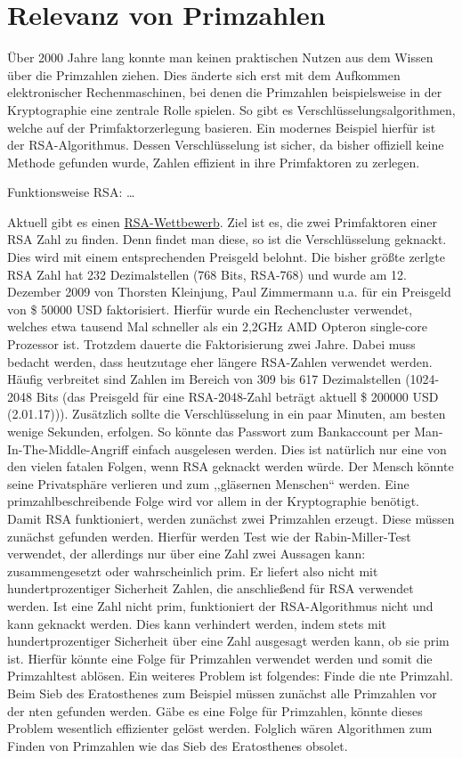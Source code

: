 \documentclass[a4paper,12pt]{article}
\begin{document}
\section{Relevanz von Primzahlen}
Über 2000 Jahre lang konnte man keinen praktischen Nutzen aus dem Wissen über die Primzahlen ziehen. Dies änderte sich erst mit dem Aufkommen elektronischer Rechenmaschinen, bei denen die Primzahlen beispielsweise in der Kryptographie eine zentrale Rolle spielen. So gibt es Verschlüsselungsalgorithmen, welche auf der Primfaktorzerlegung basieren. 
Ein modernes Beispiel hierfür ist der RSA-Algorithmus. Dessen Verschlüsselung ist sicher, da bisher offiziell keine Methode gefunden wurde, Zahlen effizient in ihre Primfaktoren zu zerlegen.

Funktionsweise RSA:
…

Aktuell gibt es einen \href{https://en.wikipedia.org/wiki/RSA_Factoring_Challenge}{RSA-Wettbewerb}. Ziel ist es, die zwei Primfaktoren einer RSA Zahl zu finden. Denn findet man diese, so ist die Verschlüsselung geknackt. Dies wird mit einem entsprechenden Preisgeld belohnt.
Die bisher größte zerlgte RSA Zahl hat 232 Dezimalstellen (768 Bits, RSA-768) und wurde am 12. Dezember 2009 von Thorsten Kleinjung, Paul Zimmermann u.a. für ein Preisgeld von \$ 50000 USD faktorisiert. Hierfür wurde ein Rechencluster verwendet, welches etwa tausend Mal schneller als ein 2,2GHz AMD Opteron single-core Prozessor ist. Trotzdem dauerte die Faktorisierung zwei Jahre. 
Dabei muss bedacht werden, dass heutzutage eher längere RSA-Zahlen verwendet werden. Häufig verbreitet sind Zahlen im Bereich von 309 bis 617 Dezimalstellen (1024-2048 Bits (das Preisgeld für eine RSA-2048-Zahl beträgt aktuell \$ 200000 USD (2.01.17))).
Zusätzlich sollte die Verschlüsselung in ein paar Minuten, am besten wenige Sekunden, erfolgen. So könnte das Passwort zum Bankaccount per Man-In-The-Middle-Angriff einfach ausgelesen werden. Dies ist natürlich nur eine von den vielen fatalen Folgen, wenn RSA geknackt werden würde. Der Mensch könnte seine Privatsphäre verlieren und zum ,,gläsernen Menschen“ werden.
Eine primzahlbeschreibende Folge wird vor allem in der Kryptographie benötigt. Damit RSA funktioniert, werden zunächst zwei Primzahlen erzeugt. Diese müssen zunächst gefunden werden. Hierfür werden Test wie der Rabin-Miller-Test verwendet, der allerdings nur über eine Zahl zwei Aussagen kann: zusammengesetzt oder wahrscheinlich prim. Er liefert also nicht mit hundertprozentiger Sicherheit Zahlen, die anschließend für RSA verwendet werden. Ist eine Zahl nicht prim, funktioniert der RSA-Algorithmus nicht und kann geknackt werden. 
Dies kann verhindert werden, indem stets mit hundertprozentiger Sicherheit über eine Zahl ausgesagt werden kann, ob sie prim ist. Hierfür könnte eine Folge für Primzahlen verwendet werden und somit die Primzahltest ablösen.
Ein weiteres Problem ist folgendes: Finde die nte Primzahl. Beim Sieb des Eratosthenes zum Beispiel müssen zunächst alle Primzahlen vor der nten gefunden werden. Gäbe es eine Folge für Primzahlen, könnte dieses Problem wesentlich effizienter gelöst werden. Folglich wären Algorithmen zum Finden von Primzahlen wie das Sieb des Eratosthenes obsolet.
\end{document}
